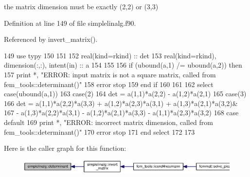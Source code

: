 the matrix dimension must be exactly (2,2) or (3,3) 



Definition at line 149 of file simplelinalg.\+f90.



Referenced by invert\+\_\+matrix().


\begin{DoxyCode}
149       \textcolor{keywordtype}{use }typy
150 
151 
152       \textcolor{keywordtype}{real(kind=rkind)} :: det
153       \textcolor{keywordtype}{real(kind=rkind)}, \textcolor{keywordtype}{dimension(:,:)}, \textcolor{keywordtype}{intent(in)} :: a
154 
155 
156       \textcolor{keywordflow}{if} (ubound(a,1) /= ubound(a,2)) \textcolor{keywordflow}{then}
157         print *, \textcolor{stringliteral}{"ERROR: input matrix is not a square matrix, called from fem\_tools::determinant()"}
158         error stop
159 \textcolor{keywordflow}{      end if}
160 
161 
162       \textcolor{keywordflow}{select case}(ubound(a,1))
163         \textcolor{keywordflow}{case}(2)
164               det = a(1,1)*a(2,2) - a(1,2)*a(2,1)
165         \textcolor{keywordflow}{case}(3)
166               det = a(1,1)*a(2,2)*a(3,3) + a(1,2)*a(2,3)*a(3,1) + a(1,3)\textcolor{comment}{*a(2,1)*a(3,2)&}
167 \textcolor{comment}{                  - a(1,3)*a(2,2)*a(3,1) - a(1,2)*a(2,1)*a(3,3) - a(1,1)*a(2,3)*a(3,2)}
168 \textcolor{comment}{}\textcolor{keywordflow}{        case default}
169               print *, \textcolor{stringliteral}{"ERROR: incorrect matrix dimension, called from fem\_tools::determinant()"}
170               error stop
171 \textcolor{keywordflow}{      end select}
172 
173 
\end{DoxyCode}


Here is the caller graph for this function\+:\nopagebreak
\begin{figure}[H]
\begin{center}
\leavevmode
\includegraphics[width=350pt]{namespacesimplelinalg_aff5df8bb70d5cb7a47e0846d391e2dae_icgraph}
\end{center}
\end{figure}


